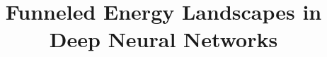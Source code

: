 \documentclass[sigconf]{acmart}
\begin{document}
\title{%
Funneled Energy Landscapes in Deep Neural Networks}




\begin{abstract}

\end{abstract}
\end{document}
